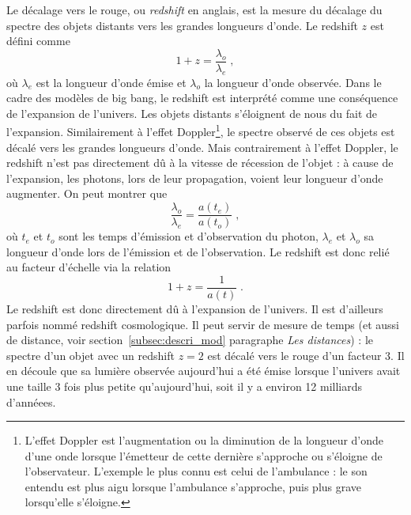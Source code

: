 Le décalage vers le rouge, ou \emph{redshift} en anglais, est la mesure du décalage du spectre des objets distants vers les grandes longueurs d'onde. Le redshift $z$ est défini comme 
\begin{equation}
  \label{eq:redshift}
  1 + z = \frac{\lambda_o}{\lambda_e}  \; ,
\end{equation}
où $\lambda_{e}$ est la longueur d'onde émise et $\lambda_{o}$ la longueur d'onde observée.
Dans le cadre des modèles de big bang, le redshift est interprété comme une conséquence de l'expansion de l'univers.
Les objets distants s'éloignent de nous du fait de l'expansion. Similairement à l'effet Doppler\footnote{L'effet Doppler est l'augmentation ou la diminution de la longueur d'onde d'une onde lorsque l'émetteur de cette dernière s'approche ou s'éloigne de l'observateur. L'exemple le plus connu est celui de l'ambulance : le son entendu est plus aigu lorsque l'ambulance s'approche, puis plus grave lorsqu'elle s'éloigne.}, le spectre observé de ces objets est décalé vers les grandes longueurs d'onde.
Mais contrairement à l'effet Doppler, le redshift n'est pas directement dû à la vitesse de récession de l'objet :
à cause de l'expansion, les photons, lors de leur propagation, voient leur longueur d'onde augmenter.
On peut montrer que
\begin{equation}
  \frac{\lambda_o}{\lambda_e} = \frac{a(t_e)}{a(t_o)}  \; ,
\end{equation}
où $t_e$ et $t_o$ sont les temps d'émission et d'observation du photon, $\lambda_{e}$  et $\lambda_{o}$ sa longueur d'onde lors de l'émission et de l'observation. Le redshift est donc relié au facteur d'échelle via la relation
\begin{equation}
  \label{eq:redshift2}
  1 + z = \frac{1}{a(t)} \; .
\end{equation} 
Le redshift est donc directement dû à l'expansion de l'univers. Il est d'ailleurs parfois nommé redshift cosmologique. Il peut servir de mesure de temps (et aussi de distance, voir section~\ref{subsec:descri_mod} paragraphe \emph{Les distances}) : le spectre d'un objet avec un redshift $z=2$ est décalé vers le rouge d'un facteur 3. Il en découle que sa lumière observée aujourd'hui a été émise lorsque l'univers avait une taille 3 fois plus petite qu'aujourd'hui, soit il y a environ 12 milliards d'annéees.


